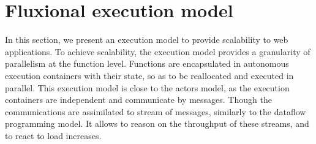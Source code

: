 \section{Fluxional execution model} \label{section:model}




In this section, we present an execution model to provide scalability to web applications.
To achieve scalability, the execution model provides a granularity of parallelism at the function level.
Functions are encapsulated in autonomous execution containers with their state, so as to be reallocated and executed in parallel.
This execution model is close to the actors model, as the execution containers are independent and communicate by messages.
Though the communications are assimilated to stream of messages, similarly to the dataflow programming model.
It allows to reason on the throughput of these streams, and to react to load increases.



